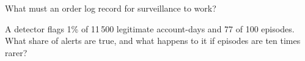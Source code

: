 \begin{interviewq}\label{iq:s2:manipulative-strategies-and-how-they-are-caught:5}
What must an order log record for surveillance to work?
\end{interviewq}

\begin{interviewq}\label{iq:s2:manipulative-strategies-and-how-they-are-caught:6}
A detector flags 1\% of 11\,500 legitimate account-days and 77 of 100 episodes. What share of alerts are true, and what happens to it if episodes
are ten times rarer?
\end{interviewq}
